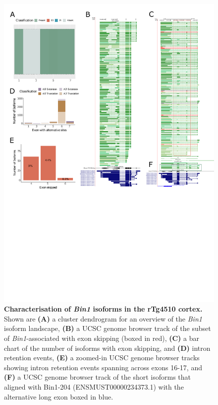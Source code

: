 \begin{figure}[htp]
	\centering
	\includegraphics[page=3,trim={0 1cm 0 0},scale = 0.85]{Figures/TargetGenes_Annotation_Portrait.pdf}
	\captionsetup{width=0.95\textwidth}
	\caption[Characterisation of the \textit{Bin1} isoform landscape]%
	{\textbf{Characterisation of \textit{Bin1} isoforms in the rTg4510 cortex.} Shown are \textbf{(A)} a cluster dendrogram for an overview of the \textit{Bin1} isoform landscape, \textbf{(B)} a UCSC genome browser track of the subset of \textit{Bin1}-associated with exon skipping (boxed in red), \textbf{(C)} a bar chart of the number of isoforms with exon skipping, and \textbf{(D)} intron retention events, \textbf{(E)} a zoomed-in UCSC genome browser tracks showing intron retention events spanning across exons 16-17, and \textbf{(F)} a UCSC genome browser track of the short isoforms that aligned with Bin1-204 (ENSMUST00000234373.1) with the alternative long exon boxed in blue.}    
	\label{fig:bin1}
\end{figure}
\restoregeometry

